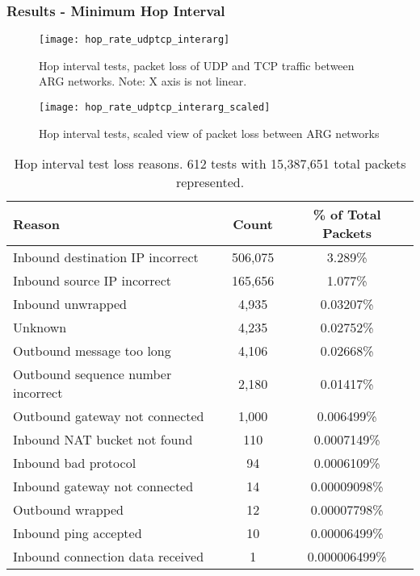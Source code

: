 \documentclass{beamer}
\begin{document}
\begin{frame}
	\frametitle{Results - Minimum Hop Interval}

	\begin{overprint}
		\begin{figure}
		\caption{Hop interval tests, packet loss of UDP and TCP traffic between ARG networks. Note: X axis is not linear.}
		\vspace{-20pt}
		\texttt{[image: hop\_rate\_udptcp\_interarg]}
		\end{figure}
		
		\begin{figure}
		\caption{Hop interval tests, scaled view of packet loss between ARG networks}
		\vspace{-20pt}
		\texttt{[image: hop\_rate\_udptcp\_interarg\_scaled]}
		\end{figure}

		\footnotesize{
		\begin{table}
		\caption{Hop interval test loss reasons. 612 tests with 15,387,651 total packets represented.}
		\label{tbl:hoprate_loss_reasons}
		\centering
		\begin{tabular}{lcc}
		\toprule
		\textbf{Reason} & \textbf{Count}  & \textbf{\% of Total Packets}\\
		\hline
		Inbound destination IP incorrect & 506,075 & 3.289\%\\
		Inbound source IP incorrect & 165,656 & 1.077\%\\
		Inbound unwrapped & 4,935 & 0.03207\%\\
		Unknown & 4,235 & 0.02752\%\\
		Outbound message too long & 4,106 & 0.02668\%\\
		Outbound sequence number incorrect & 2,180 & 0.01417\%\\
		Outbound gateway not connected & 1,000 & 0.006499\%\\
		Inbound NAT bucket not found & 110 & 0.0007149\%\\
		Inbound bad protocol & 94 & 0.0006109\%\\
		Inbound gateway not connected & 14 & 0.00009098\%\\
		Outbound wrapped & 12 & 0.00007798\%\\
		Inbound ping accepted & 10 & 0.00006499\%\\
		Inbound connection data received & 1 & 0.000006499\%\\
		\bottomrule
		\end{tabular}
		\end{table}
		}
	

	\end{overprint}
\end{frame}
\end{document}
